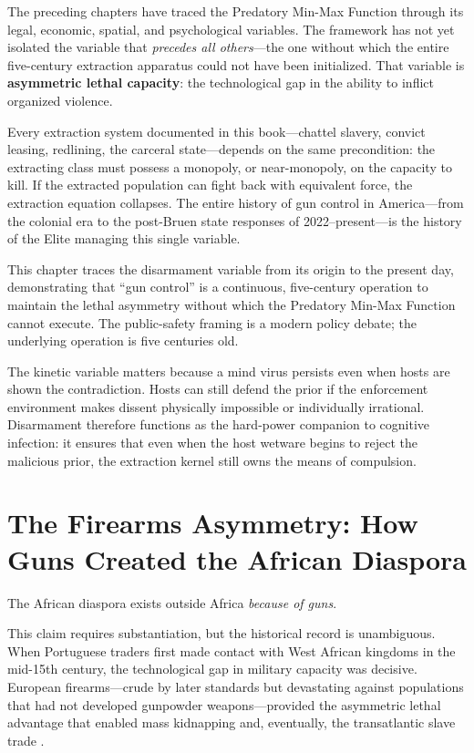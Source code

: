 \medskip

The preceding chapters have traced the Predatory Min-Max Function through its legal, economic, spatial, and psychological variables. The framework has not yet isolated the variable that \textit{precedes all others}---the one without which the entire five-century extraction apparatus could not have been initialized. That variable is \textbf{asymmetric lethal capacity}: the technological gap in the ability to inflict organized violence.

Every extraction system documented in this book---chattel slavery, convict leasing, redlining, the carceral state---depends on the same precondition: the extracting class must possess a monopoly, or near-monopoly, on the capacity to kill. If the extracted population can fight back with equivalent force, the extraction equation collapses. The entire history of gun control in America---from the colonial era to the post-Bruen state responses of 2022--present---is the history of the Elite managing this single variable.

This chapter traces the disarmament variable from its origin to the present day, demonstrating that ``gun control'' is a continuous, five-century operation to maintain the lethal asymmetry without which the Predatory Min-Max Function cannot execute. The public-safety framing is a modern policy debate; the underlying operation is five centuries old.

The kinetic variable matters because a mind virus persists even when hosts are shown the contradiction. Hosts can still defend the prior if the enforcement environment makes dissent physically impossible or individually irrational. Disarmament therefore functions as the hard-power companion to cognitive infection: it ensures that even when the host wetware begins to reject the malicious prior, the extraction kernel still owns the means of compulsion.

\section{The Firearms Asymmetry: How Guns Created the African Diaspora}

The African diaspora exists outside Africa \textit{because of guns}.

This claim requires substantiation, but the historical record is unambiguous. When Portuguese traders first made contact with West African kingdoms in the mid-15th century, the technological gap in military capacity was decisive. European firearms---crude by later standards but devastating against populations that had not developed gunpowder weapons---provided the asymmetric lethal advantage that enabled mass kidnapping and, eventually, the transatlantic slave trade \cite{thornton}.

